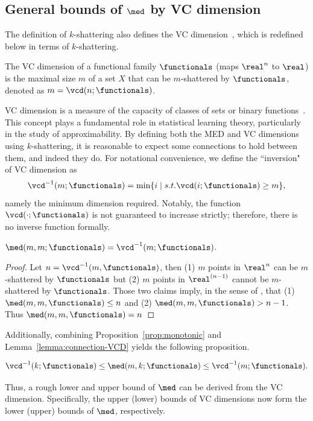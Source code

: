 \subsection{General bounds of $\med$ by VC dimension}

The definition of $k$-shattering also defines the VC dimension~\citep{mohri2018foundations}, which is redefined below in terms of $k$-shattering.
\begin{definition}[VC dimension]
    The VC dimension of a functional family $\functionals$ (maps $\real^n$ to $\real$) is the maximal size $m$ of a set $X$ that can be $m$-shattered by $\functionals$, denoted as $m = \vcd(n; \functionals)$.
\end{definition}
VC dimension is a measure of the capacity of classes of sets or binary functions~\citep{vapnik2013nature}. This concept plays a fundamental role in statistical learning theory, particularly in the study of approximability. By defining both the MED and VC dimensions using $k$-shattering, it is reasonable to expect some connections to hold between them, and indeed they do. For notational convenience, we define the ``inversion" of VC dimension as $$\vcd^{-1}(m; \functionals)=\min \{i \mid s.t. \vcd(i;\functionals)\ge m\},$$ namely the minimum dimension required. Notably, the function $\vcd(\cdot ;\functionals)$ is not guaranteed to increase strictly; therefore, there is no inverse function formally.
\begin{lemma}\label{lemma:connection-VCD}
    $\med(m, m;\functionals) = \vcd^{-1}(m;\functionals)$.
\end{lemma}

\begin{proof}
    Let $n = \vcd^{-1}(m, \functionals)$, then (1) $m$ points in $\real^n$ can be $m$-shattered by $\functionals$ but (2) $m$ points in $\real^{(n-1)}$ cannot be $m$-shattered by $\functionals$. Those two claims imply, in the sense of \med, that (1) $\med(m, m, \functionals) \leq n$ and (2) $\med(m, m, \functionals) > n - 1$. Thus $\med(m, m, \functionals) = n$
\end{proof}


Additionally, combining Proposition~\ref{prop:monotonic} and Lemma~\ref{lemma:connection-VCD} yields the following proposition.
\begin{proposition}\label{prop:vc-bounds}
    $$\vcd^{-1}(k; \functionals) \leq \med(m, k; \functionals) \leq \vcd^{-1}(m; \functionals).$$
\end{proposition}
Thus, a rough lower and upper bound of $\med$ can be derived from the VC dimension. Specifically, the upper (lower) bounds of VC dimensions now form the lower (upper) bounds of $\med$, respectively.

